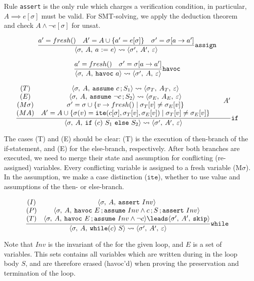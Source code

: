 \documentclass[a4paper]{article}
\DeclareMathOperator{\semi}{;}
\begin{document}
Rule \texttt{assert} is the only rule which charges a verification condition, in
particular, $A \implies e[\sigma]$ must be valid. For SMT-solving, we apply the
deduction theorem and check $A \wedge \neg e[\sigma]$ for unsat.

\begin{equation}
  \label{ex:1}
  \frac%
  {
    a'=fresh()
    \quad
    A' = A \cup \{a' = e[\sigma]\}
    \quad
    \sigma' = \sigma[a \to a']
  }%
  {
    \config\sigma A{a~\mathtt{:=}~e}
    \leadsto
    \config{\sigma'}{A'}{\epsilon}
  }\mathtt{assign}
\end{equation}

\begin{equation}
  \label{ex:1}
  \frac%
  {
    a'=fresh()
    \quad
    \sigma' = \sigma[a \to a']
  }%
  {
    \config\sigma A{\mathtt{havoc}~a}
    \leadsto
    \config{\sigma'}{A}{\epsilon}
  }\mathtt{havoc}
\end{equation}

\begin{equation}
  \label{ex:1}
  \frac%
  {
    \begin{matrix}
      (T) & \config\sigma A{\mathtt{assume}~c\semi S_1} \leadsto \config{\sigma_T}{A_T}{\epsilon}\\
      (E) & \config\sigma A{\mathtt{assume}~\neg c\semi S_2}\leadsto \config{\sigma_E}{A_E}{\epsilon}\\
      (M\sigma)& \sigma' = \sigma \cup \{ v \to fresh() \mid \sigma_T[v] \neq \sigma_E[v] \}\\
      (MA)& A' = A \cup \{  \sigma(v) = \mathtt{ite}(c[\sigma],  \sigma_T[v], \sigma_E[v])   \mid \sigma_T[v] \neq \sigma_E[v]  \}
    \end{matrix}
    \quad
    \quad
    A' 
  }%
  {
    \config\sigma A{\mathtt{if}~(c)~S_1~\mathtt{else}~S_2}
    \leadsto
    \config{\sigma'}{A'}{\epsilon}
  }\mathtt{if}
\end{equation}

The cases (T) and (E) should be clear: (T) is the execution of then-branch of
the if-statement, and (E) for the else-branch, respectively. After both branches
are executed, we need to merge their state and assumption for conflicting
(re-assigned) variables. Every conflicting variable is assigned to a fresh
variable (M$\sigma$). In the assumption, we make a case distinction
($\mathtt{ite}$), whether to use value and assumptions of the then- or
else-branch.

\begin{equation}
  \label{ex:1}
  \frac%
  {
    \begin{matrix}
      (I) &\config{\sigma}{A%
      }{\mathtt{assert}~Inv}\\
      (P) &\config{\sigma}{A}{\mathtt{havoc}~E\semi\mathtt{assume}~Inv\land
        c\semi S\semi\mathtt{assert}~Inv}\\
      (T) &\config{\sigma}{A}{\mathtt{havoc}~E\semi\mathtt{assume}~Inv\land\neg
        c} \leads \config{\sigma'}{A'}{\mathtt{skip}}
    \end{matrix}
  }%
  {
    \config\sigma A{\mathtt{while}(c)~S}
    \leadsto
    \config{\sigma'}{A'}{\epsilon}
  }\mathtt{while}
\end{equation}

Note that $Inv$ is the invariant of the for the given loop, and $E$ is a set of
variables. This sets contains all variables which are written during in the loop
body $S$, and are therefore erased (havoc'd) when proving the preservation and
termination of the loop.
\end{document}
